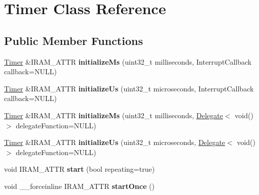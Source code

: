 \hypertarget{class_timer}{}\section{Timer Class Reference}
\label{class_timer}
\subsection*{Public Member Functions}
\begin{DoxyCompactItemize}
\item 
\hypertarget{class_timer_a48d852af74517b2bbd34db342358774e}{}\hyperlink{class_timer}{Timer} \&I\+R\+A\+M\+\_\+\+A\+T\+T\+R {\bfseries initialize\+Ms} (uint32\+\_\+t milliseconds, Interrupt\+Callback callback=N\+U\+L\+L)\label{class_timer_a48d852af74517b2bbd34db342358774e}

\item 
\hypertarget{class_timer_aaa507e87f79164d37757a6692a669289}{}\hyperlink{class_timer}{Timer} \&I\+R\+A\+M\+\_\+\+A\+T\+T\+R {\bfseries initialize\+Us} (uint32\+\_\+t microseconds, Interrupt\+Callback callback=N\+U\+L\+L)\label{class_timer_aaa507e87f79164d37757a6692a669289}

\item 
\hypertarget{class_timer_ac44d02bd19c5706a99a967e828fb2e9c}{}\hyperlink{class_timer}{Timer} \&I\+R\+A\+M\+\_\+\+A\+T\+T\+R {\bfseries initialize\+Ms} (uint32\+\_\+t milliseconds, \hyperlink{class_delegate}{Delegate}$<$ void()$>$ delegate\+Function=N\+U\+L\+L)\label{class_timer_ac44d02bd19c5706a99a967e828fb2e9c}

\item 
\hypertarget{class_timer_a79d7bf555311954ee08d5ca78c730db1}{}\hyperlink{class_timer}{Timer} \&I\+R\+A\+M\+\_\+\+A\+T\+T\+R {\bfseries initialize\+Us} (uint32\+\_\+t microseconds, \hyperlink{class_delegate}{Delegate}$<$ void()$>$ delegate\+Function=N\+U\+L\+L)\label{class_timer_a79d7bf555311954ee08d5ca78c730db1}

\item 
\hypertarget{class_timer_a2599f4f19c38f5d2c2a6e567738a41e6}{}void I\+R\+A\+M\+\_\+\+A\+T\+T\+R {\bfseries start} (bool repeating=true)\label{class_timer_a2599f4f19c38f5d2c2a6e567738a41e6}

\item 
\hypertarget{class_timer_a79112b78bb1930a3350858c15221ac97}{}void \+\_\+\+\_\+forceinline I\+R\+A\+M\+\_\+\+A\+T\+T\+R {\bfseries start\+Once} ()\label{class_timer_a79112b78bb1930a3350858c15221ac97}


\end{DoxyCompactItemize}
